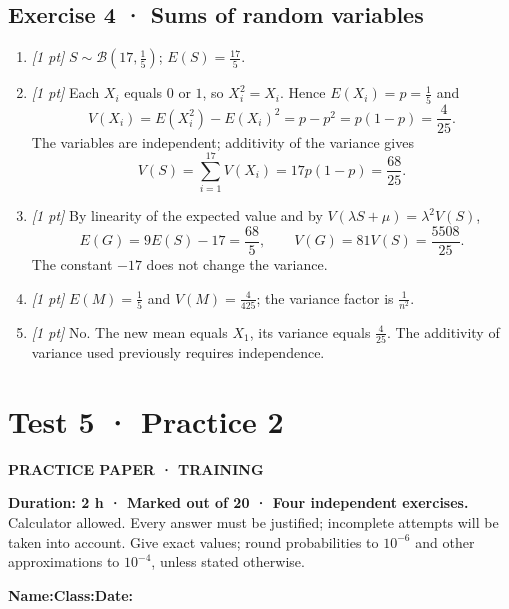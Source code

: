 \subsection*{Exercise 4 · Sums of random variables}\begin{enumerate}

\item \textit{[1 pt]} $S\sim\mathcal B(17,\frac{1}{5})$; $E(S)=\frac{17}{5}$.

\item \textit{[1 pt]} Each $X_i$ equals $0$ or $1$, so $X_i^2=X_i$. Hence $E(X_i)=p=\frac{1}{5}$ and
\[V(X_i)=E(X_i^2)-E(X_i)^2=p-p^2=p(1-p)=\frac{4}{25}.\]
The variables are independent; additivity of the variance gives
\[V(S)=\sum_{i=1}^{17}V(X_i)=17p(1-p)=\frac{68}{25}.\]

\item \textit{[1 pt]} By linearity of the expected value and by $V(\lambda S+\mu)=\lambda^2V(S)$,
\[E(G)=9E(S)-17=\frac{68}{5},\qquad V(G)=81V(S)=\frac{5508}{25}.\]
The constant $-17$ does not change the variance.

\item \textit{[1 pt]} $E(M)=\frac{1}{5}$ and $V(M)=\frac{4}{425}$; the variance factor is $\frac{1}{n^2}$.

\item \textit{[1 pt]} No. The new mean equals $X_1$, its variance equals $\frac{4}{25}$. The additivity of variance used previously requires independence.

\end{enumerate}

\fi

\clearpage{}\label{sujet:7-2}

\section*{Test 5 · Practice 2}

{\sffamily\bfseries\color{teal}PRACTICE PAPER · TRAINING\par}

\textbf{Duration: 2 h · Marked out of 20 · Four independent exercises.}\\Calculator allowed. Every answer must be justified; incomplete attempts will be taken into account. Give exact values; round probabilities to $10^{-6}$ and other approximations to $10^{-4}$, unless stated otherwise.

\smallskip\textbf{Name:}\enspace\dotfill\quad\textbf{Class:}\enspace\dotfill\quad\textbf{Date:}\enspace\dotfill

